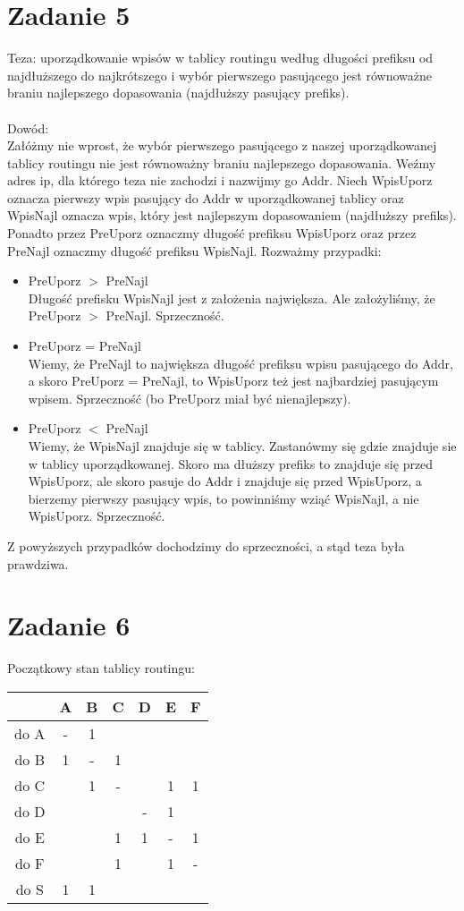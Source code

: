\documentclass[11pt,wide]{article}
\begin{document}
\section{Zadanie 5}
Teza: uporządkowanie wpisów w tablicy routingu według długości prefiksu od najdłuższego do najkrótszego i wybór pierwszego pasującego jest równoważne braniu najlepszego dopasowania (najdłuższy pasujący prefiks).\\\\
Dowód: \\
Załóżmy nie wprost, że wybór pierwszego pasującego z naszej uporządkowanej tablicy routingu nie jest równoważny braniu najlepszego dopasowania. Weźmy adres ip, dla którego teza nie zachodzi i nazwijmy go Addr. Niech WpisUporz oznacza pierwszy wpis pasujący do Addr w uporządkowanej tablicy oraz WpisNajl oznacza wpis, który jest najlepszym dopasowaniem (najdłuższy prefiks). Ponadto przez PreUporz oznaczmy długość prefiksu WpisUporz oraz przez PreNajl oznaczmy długość prefiksu WpisNajl. Rozważmy przypadki:
\begin{itemize}
\item PreUporz $>$ PreNajl \\
Długość prefisku WpisNajl jest z założenia największa. Ale założyliśmy, że PreUporz $>$ PreNajl. Sprzeczność.
\item PreUporz = PreNajl \\
Wiemy, że PreNajl to największa długość prefiksu wpisu pasującego do Addr, a skoro PreUporz = PreNajl, to WpisUporz też jest najbardziej pasującym wpisem. Sprzeczność (bo PreUporz miał być nienajlepszy).
\item PreUporz $<$ PreNajl \\
Wiemy, że WpisNajl znajduje się w tablicy. Zastanówmy się gdzie znajduje sie w tablicy uporządkowanej. Skoro ma dłuższy prefiks to znajduje się przed WpisUporz, ale skoro pasuje do Addr i znajduje się przed WpisUporz, a bierzemy pierwszy pasujący wpis, to powinniśmy wziąć WpisNajl, a nie WpisUporz. Sprzeczność.
\end{itemize}
Z powyższych przypadków dochodzimy do sprzeczności, a stąd teza była prawdziwa.

\section{Zadanie 6}
Początkowy stan tablicy routingu:\\
\begin{tabular}{|c|c|c|c|c|c|c|}\hline
 & A & B & C & D & E & F\\
\hline 
do A & - & 1 & & & &\\
\hline 
do B & 1 & - & 1 & & &\\
\hline 
do C & & 1 & - & & 1 & 1\\
\hline 
do D & & & & - & 1 &\\
\hline 
do E & & & 1 & 1 & - & 1\\
\hline
do F & & & 1 & & 1 & - \\
\hline
do S & 1 & 1 & & & & \\
\hline
\end{tabular}\\\\
\end{document}
